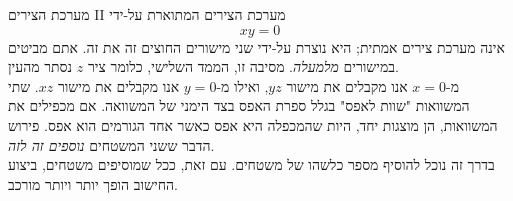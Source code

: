 \begin{surferPage}[Coordinates II]{מערכת הצירים II}
מערכת הצירים המתוארת על-ידי 
\[xy=0\]
אינה מערכת צירים אמתית; היא נוצרת על-ידי שני מישורים החוצים זה את זה. אתם מביטים במישורים {\it מלמעלה}. מסיבה זו, הממד השלישי, כלומר ציר $z$ נסתר מהעין. \\
\vspace{0,3cm}
מ-$x=0$ אנו מקבלים את מישור $yz$, ואילו מ-$y=0$ אנו מקבלים את מישור $xz$.
שתי המשוואות  "שוות לאפס" בגלל ספרת האפס בצד הימני של המשוואה. אם מכפילים את המשוואות, הן מוצגות יחד, היות שהמכפלה היא אפס כאשר אחד הגורמים הוא אפס. פירוש הדבר ששני המשטחים {\it נוספים זה לזה}. \\
בדרך זה נוכל להוסיף מספר כלשהו של משטחים. עם זאת, ככל שמוסיפים משטחים, ביצוע החישוב הופך יותר ויותר מורכב.
\end{surferPage}
